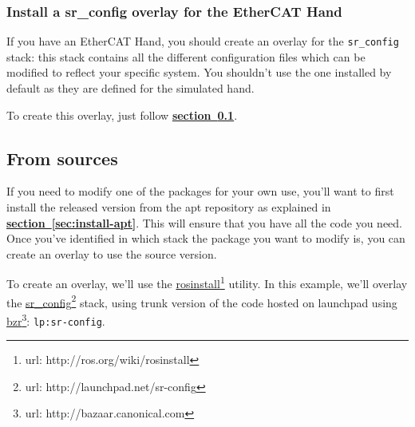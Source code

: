 \documentclass[12pt]{article}
\newcommand{\link}[1]{\hyperref[sec:#1]{\textbf{section~\ref*{sec:#1}}}}
\newcommand{\betterhref}[2]{\href{#1}{#2}\footnote{url: #1}}
\begin{document}
\subsubsection{Install a sr\_config overlay for the EtherCAT Hand}
\label{sec:install-cfg}
\par If you have an EtherCAT Hand, you should create an overlay for the \texttt{sr\_config} stack: this stack contains all the different configuration files which can be modified to reflect your specific system. You shouldn't use the one installed by default as they are defined for the simulated hand.\\

\par To create this overlay, just follow \link{install-src}.

\subsection{From sources}
\label{sec:install-src}
\par If you need to modify one of the packages for your own use, you'll want to first install the released version from the apt repository as explained in \link{install-apt}. This will ensure that you have all the code you need. Once you've identified in which stack the package you want to modify is, you can create an overlay to use the source version.\\

\par To create an overlay, we'll use the \betterhref{http://ros.org/wiki/rosinstall}{rosinstall} utility. In this example, we'll overlay the \betterhref{http://launchpad.net/sr-config}{sr\_config} stack, using trunk version of the code hosted on launchpad using \betterhref{http://bazaar.canonical.com}{bzr}: \texttt{lp:sr-config}.
\end{document}
